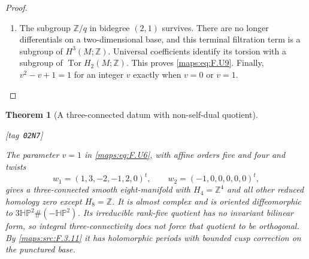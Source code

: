 \documentclass[11pt,a4paper]{article}
\numberwithin{equation}{section}
\newtheorem{theorem}{Theorem}[section]
\theoremstyle{definition}
\newcommand{\StatementRecord}[4]{{\upshape\footnotesize[tag~\texttt{#3}]}\enspace\ignorespaces}
\begin{document}
\begin{proof}
\begin{enumerate}[label=\arabic*.]
\item The subgroup $\mathbb Z/q$ in bidegree $(2,1)$ survives.
There are no longer differentials on a two-dimensional base,
and this terminal filtration term is a subgroup of
$H^3(M;\mathbb Z)$.  Universal coefficients identify its
torsion with a subgroup of $\operatorname{Tor}H_2(M;\mathbb Z)$.
This proves \eqref{maps:eq:F.U9}.  Finally, $v^2-v+1=1$ for an integer $v$
exactly when $v=0$ or $v=1$.

\end{enumerate}
\end{proof}




\begin{theorem}[A three-connected datum with non-self-dual quotient]\hypertarget{tag-02N7}{}\label{maps:src:F.2.18}
\StatementRecord{maps:src:F.2.18}{proved}{02N7}{\eqref{maps:eq:F.U6}, \cref{maps:src:F.3.11}, \cref{pub:V:smooth-gluing}, \cref{maps:src:F.2.16}, \cref{maps:src:F.2.6}, \cref{pub:V:integral-restrictions}, \eqref{maps:eq:F.6}, \cref{maps:src:F.4.1}}


The parameter $v=1$ in \eqref{maps:eq:F.U6}, with affine orders five and four
and twists
\[
 w_1=(1,3,-2,-1,2,0)^t,\qquad
 w_2=(-1,0,0,0,0,0)^t,
\]
gives a three-connected smooth eight-manifold with
$H_4=\mathbb Z^4$ and all other reduced homology zero except
$H_8=\mathbb Z$.  It is almost complex and is oriented
diffeomorphic to $3\mathbb{HP}^2\#(-\mathbb{HP}^2)$.
Its irreducible rank-five quotient has no invariant bilinear
form, so integral three-connectivity does not force that
quotient to be orthogonal.  By \cref{maps:src:F.3.11} it has holomorphic periods with bounded cusp correction on the punctured base.

\end{theorem}
\end{document}
